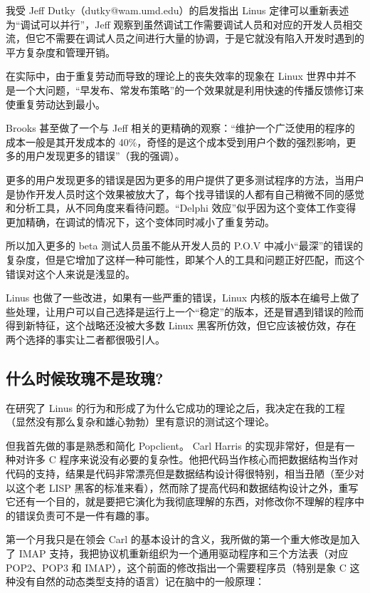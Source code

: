 我受 Jeff Dutky（dutky@wam.umd.edu）的启发指出 Linus 定律可以重新表述为“调试可以并行”，Jeff 观察到虽然调试工作需要调试人员和对应的开发人员相交流，但它不需要在调试人员之间进行大量的协调，于是它就没有陷入开发时遇到的平方复杂度和管理开销。

在实际中，由于重复劳动而导致的理论上的丧失效率的现象在 Linux 世界中并不是一个大问题，“早发布、常发布策略”的一个效果就是利用快速的传播反馈修订来使重复劳动达到最小。


Brooks 甚至做了一个与 Jeff 相关的更精确的观察：“维护一个广泛使用的程序的成本一般是其开发成本的 40\%，奇怪的是这个成本受到用户个数的强烈影响，更多的用户发现更多的错误”（我的强调）。

更多的用户发现更多的错误是因为更多的用户提供了更多测试程序的方法，当用户是协作开发人员时这个效果被放大了，每个找寻错误的人都有自己稍微不同的感觉和分析工具，从不同角度来看待问题。“Delphi 效应”似乎因为这个变体工作变得更加精确，在调试的情况下，这个变体同时减小了重复劳动。


所以加入更多的 beta 测试人员虽不能从开发人员的 P.O.V 中减小“最深”的错误的复杂度，但是它增加了这样一种可能性，即某个人的工具和问题正好匹配，而这个错误对这个人来说是浅显的。


Linus 也做了一些改进，如果有一些严重的错误，Linux 内核的版本在编号上做了些处理，让用户可以自己选择是运行上一个“稳定”的版本，还是冒遇到错误的险而得到新特征，这个战略还没被大多数 Linux 黑客所仿效，但它应该被仿效，存在两个选择的事实让二者都很吸引人。


\subsection{什么时候玫瑰不是玫瑰?}


在研究了 Linus 的行为和形成了为什么它成功的理论之后，我决定在我的工程（显然没有那么复杂和雄心勃勃）里有意识的测试这个理论。

但我首先做的事是熟悉和简化 Popclient。 Carl Harris 的实现非常好，但是有一种对许多 C 程序来说没有必要的复杂性。他把代码当作核心而把数据结构当作对代码的支持，结果是代码非常漂亮但是数据结构设计得很特别，相当丑陋（至少对以这个老 LISP 黑客的标准来看），然而除了提高代码和数据结构设计之外，重写它还有一个目的，就是要把它演化为我彻底理解的东西，对修改你不理解的程序中的错误负责可不是一件有趣的事。


第一个月我只是在领会 Carl 的基本设计的含义，我所做的第一个重大修改是加入了 IMAP 支持，我把协议机重新组织为一个通用驱动程序和三个方法表（对应 POP2、POP3 和 IMAP），这个前面的修改指出一个需要程序员（特别是象 C 这种没有自然的动态类型支持的语言）记在脑中的一般原理：

